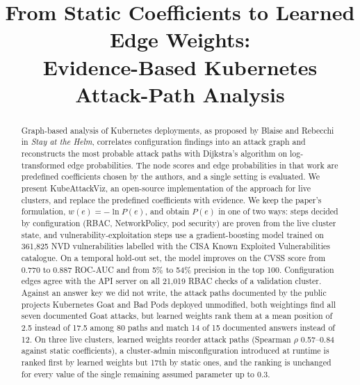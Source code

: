 \documentclass[conference]{IEEEtran}
\begin{document}
\title{From Static Coefficients to Learned Edge Weights:\\
Evidence-Based Kubernetes Attack-Path Analysis}

\author{
}

\maketitle

\begin{abstract}
Graph-based analysis of Kubernetes deployments, as proposed by Blaise and Rebecchi in \emph{Stay at the Helm}, correlates
configuration findings into an attack graph and reconstructs the most probable attack paths with Dijkstra's algorithm on
log-transformed edge probabilities. The node scores and edge probabilities in that work are predefined coefficients chosen by
the authors, and a single setting is evaluated. We present KubeAttackViz, an open-source implementation of the approach for live
clusters, and replace the predefined coefficients with evidence. We keep the paper's formulation, $w(e)=-\ln P(e)$, and obtain
$P(e)$ in one of two ways: steps decided by configuration (RBAC, NetworkPolicy, pod security) are proven from the live cluster
state, and vulnerability-exploitation steps use a gradient-boosting model trained on 361,825 NVD vulnerabilities labelled with
the CISA Known Exploited Vulnerabilities catalogue. On a temporal hold-out set, the model improves on the CVSS score from 0.770
to 0.887 ROC-AUC and from 5\% to 54\% precision in the top 100. Configuration edges agree with the API server on all 21,019
RBAC checks of a validation cluster. Against an answer key we did not write, the attack paths documented by the public projects
Kubernetes Goat and Bad Pods deployed unmodified, both weightings find all seven documented Goat attacks, but learned weights rank
them at a mean position of 2.5 instead of 17.5 among 80 paths and match 14 of 15 documented answers instead of 12. On three
live clusters, learned weights reorder attack paths (Spearman $\rho$ 0.57--0.84 against static coefficients), a cluster-admin
misconfiguration introduced at runtime is ranked first by learned weights but 17th by static ones, and the ranking is unchanged
for every value of the single remaining assumed parameter up to 0.3.
\end{abstract}
\end{document}
